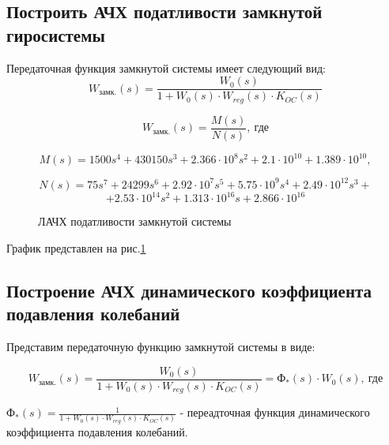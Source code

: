 \documentclass[main.tex]{subfiles}
\begin{document}
\subsection{Построить АЧХ податливости замкнутой гиросистемы}
Передаточная функция замкнутой системы имеет следующий вид:
 \[ W_\text{замк.}(s) = \frac{W_0(s)}{1 + W_0(s)\cdot W_{reg}(s)\cdot K_{OC}(s)} \]

\[ W_\text{замк.}(s) = \frac{M(s)}{N(s)},\ \text{где} \]
    
\[ M(s) = 1500s^4 + 430150s^3 + 2.366 \cdot 10^{8}s^2 + 2.1 \cdot 10^{10} + 1.389 \cdot 10^{10}, \]

 \[ N(s) = 75s^7 + 24299s^6 + 2.92 \cdot 10^{7}s^5 + 5.75 \cdot 10^{9}s^4 + 2.49 \cdot 10^{12}s^3 + \]
 \[+ 2.53 \cdot 10^{14}s^2 + 1.313 \cdot 10^{16}s + 2.866 \cdot 10^{16} \]

\begin{figure}[h]
    \caption{ЛАЧХ податливости замкнутой системы}
    \label{fig:p8_achx}
\end{figure}

 График представлен на рис.\ref{fig:p8_achx} 

\subsection{Построение АЧХ динамического коэффициента подавления колебаний}
Представим передаточную функцию замкнутой системы в виде:

 \[  W_\text{замк.}(s) = \frac{W_0(s)}{1 + W_0(s)\cdot W_{reg}(s)\cdot K_{OC}(s)} = \text{Ф}_*(s) \cdot W_0(s),\ \text{где} \]

\( \text{Ф}_*(s) = \frac{1}{1 + W_0(s)\cdot W_{reg}(s)\cdot K_{OC}(s)} \) - переадточная функция динамического 
коэффициента подавления колебаний.
\end{document}
